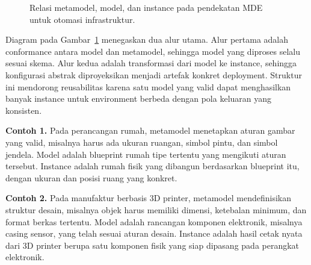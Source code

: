 \begin{figure}[htbp]
\centering
{}%
\caption{Relasi metamodel, model, dan instance pada pendekatan MDE untuk otomasi infrastruktur.}
\label{fig:mde-metamodel-model-instance}
\end{figure}

Diagram pada Gambar~\ref{fig:mde-metamodel-model-instance} menegaskan dua alur utama. Alur pertama adalah conformance antara model dan metamodel, sehingga model yang diproses selalu sesuai skema. Alur kedua adalah transformasi dari model ke instance, sehingga konfigurasi abstrak diproyeksikan menjadi artefak konkret deployment. Struktur ini mendorong reusabilitas karena satu model yang valid dapat menghasilkan banyak instance untuk environment berbeda dengan pola keluaran yang konsisten.

\textbf{Contoh 1.} Pada perancangan rumah, metamodel menetapkan aturan gambar yang valid, misalnya harus ada ukuran ruangan, simbol pintu, dan simbol jendela. Model adalah blueprint rumah tipe tertentu yang mengikuti aturan tersebut. Instance adalah rumah fisik yang dibangun berdasarkan blueprint itu, dengan ukuran dan posisi ruang yang konkret.

\textbf{Contoh 2.} Pada manufaktur berbasis 3D printer, metamodel mendefinisikan struktur desain, misalnya objek harus memiliki dimensi, ketebalan minimum, dan format berkas tertentu. Model adalah rancangan komponen elektronik, misalnya casing sensor, yang telah sesuai aturan desain. Instance adalah hasil cetak nyata dari 3D printer berupa satu komponen fisik yang siap dipasang pada perangkat elektronik.

